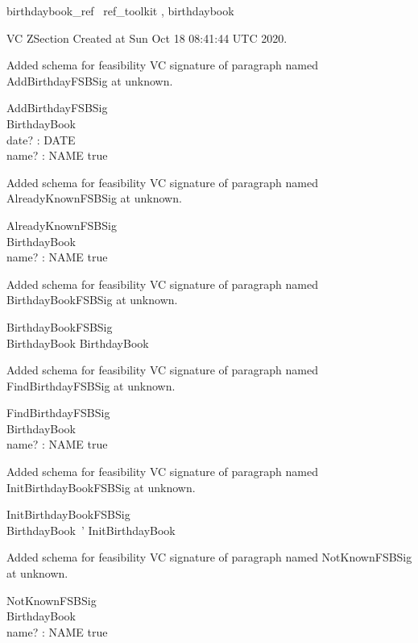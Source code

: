 \documentclass{article}
\begin{document}

\begin{zsection}	 \SECTION birthdaybook\_ref \parents~ref\_toolkit , birthdaybook
\end{zsection}

VC ZSection Created at Sun Oct 18 08:41:44 UTC 2020.


Added schema for feasibility VC signature of paragraph named AddBirthdayFSBSig at unknown.
\begin{schema}{AddBirthdayFSBSig}
\\
 BirthdayBook \\
 date? : DATE \\
 name? : NAME 
\where
 true
\end{schema}


Added schema for feasibility VC signature of paragraph named AlreadyKnownFSBSig at unknown.
\begin{schema}{AlreadyKnownFSBSig}
\\
 BirthdayBook \\
 name? : NAME 
\where
 true
\end{schema}


Added schema for feasibility VC signature of paragraph named BirthdayBookFSBSig at unknown.
\begin{schema}{BirthdayBookFSBSig}
\\
 BirthdayBook 
\where
 BirthdayBook
\end{schema}


Added schema for feasibility VC signature of paragraph named FindBirthdayFSBSig at unknown.
\begin{schema}{FindBirthdayFSBSig}
\\
 BirthdayBook \\
 name? : NAME 
\where
 true
\end{schema}


Added schema for feasibility VC signature of paragraph named InitBirthdayBookFSBSig at unknown.
\begin{schema}{InitBirthdayBookFSBSig}
\\
 BirthdayBook~' 
\where
 InitBirthdayBook
\end{schema}


Added schema for feasibility VC signature of paragraph named NotKnownFSBSig at unknown.
\begin{schema}{NotKnownFSBSig}
\\
 BirthdayBook \\
 name? : NAME 
\where
 true
\end{schema}
\end{document}
